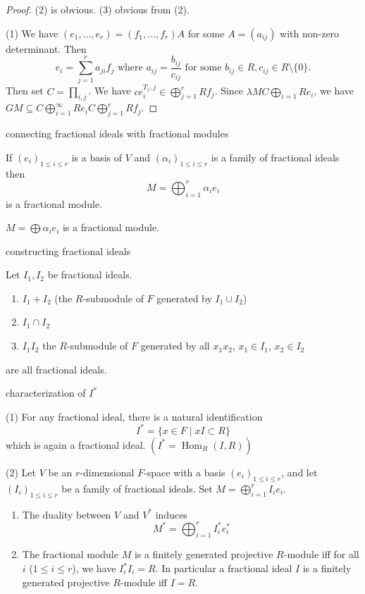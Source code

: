 \documentclass[11pt, a4paper]{report}
\begin{document}
\begin{proof}
(2) is obvious. (3) obvious from (2).

(1) We have $(e_{1}, \ldots, e_{r}) = (f_{1}, \ldots, f_{r})A$ for some $A = (a_{ij})$ with non-zero determinant. Then
\[
e_{i} = \sum_{j=1}^{r} a_{ji} f_{j} \text{ where } a_{ij} = \frac{b_{ij}}{c_{ij}} \text{ for some } b_{ij} \in R, c_{ij} \in R \setminus \{0\}.
\]
Then set $C = \prod_{i,j}$. We have $c e_{i}^{T_{1},j} \in \bigoplus_{j=1}^{r} R f_{j}$. Since $\lambda M C \bigoplus_{i=1} R e_{i}$, we have $G M \subseteq C \bigoplus_{i=1}^{\infty} R e_{i} C \bigoplus_{j=1}^{r} R f_{j}$.
\end{proof}

\begin{corollary}
connecting fractional ideals with fractional modules

If $(e_{i})_{1 \leq i \leq r}$ is a basis of $V$ and $(\alpha_{i})_{1 \leq i \leq r}$ is a family of fractional ideals then
\[
M = \bigoplus_{i=1}^{r} \alpha_{i} e_{i}
\]
is a fractional module.

$M = \bigoplus \alpha_{i} e_{i}$ is a fractional module.
\end{corollary}

\begin{lemma}
constructing fractional ideals

Let $I_{1}, I_{2}$ be fractional ideals.
\begin{enumerate}
\item $I_{1} + I_{2}$ (the $R$-submodule of $F$ generated by $I_{1} \cup I_{2}$)
\item $I_{1} \cap I_{2}$
\item $I_{1} I_{2}$ the $R$-submodule of $F$ generated by all $x_{1} x_{2}$, $x_{1} \in I_{1}$, $x_{2} \in I_{2}$
\end{enumerate}
are all fractional ideals.
\end{lemma}

\begin{proposition}
characterization of $I^{*}$

(1) For any fractional ideal, there is a natural identification
\[
I^{*} = \{x \in F \mid x I \subset R\}
\]
which is again a fractional ideal.
$\left(I^{*} = \operatorname{Hom}_{R}(I, R)\right)$

(2) Let $V$ be an $r$-dimensional $F$-space with a basis $(e_{i})_{1 \leq i \leq r}$, and let $(I_{i})_{1 \leq i \leq r}$ be a family of fractional ideals.
Set $M = \bigoplus_{i=1}^{r} I_{i} e_{i}$.
\begin{enumerate}
\item[(a)] The duality between $V$ and $V^{*}$ induces
\[
M^{*} = \bigoplus_{i=1}^{r} I_{i}^{*} e_{i}^{*}
\]
\item[(b)] The fractional module $M$ is a finitely generated projective $R$-module iff for all $i$ ($1 \leq i \leq r$), we have $I_{i}^{*} I_{i} = R$.
In particular a fractional ideal $I$ is a finitely generated projective $R$-module iff $I = R$.
\end{enumerate}
\end{proposition}
\end{document}
